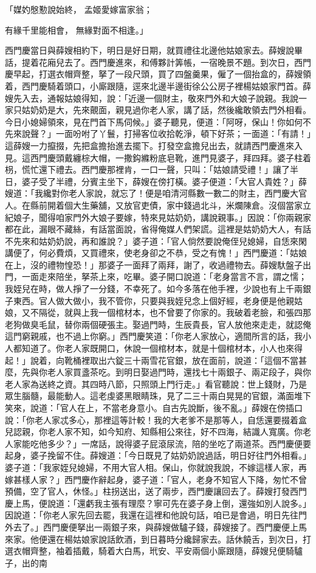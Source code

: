 「媒妁慇懃說始終，  孟姬愛嫁富家翁；

有緣千里能相會，  無緣對面不相逢。」

西門慶當日與薛嫂相約下，明日是好日期，就買禮往北邊他姑娘家去。薛嫂說畢話，提着花廂兒去了。西門慶進來，和傅夥計筭帳，一宿晚景不題。到次日，西門慶早起，打選衣帽齊整，拏了一段尺頭，買了四盤羹果，僱了一個抬盒的，薛嫂領着，西門慶騎着頭口，小廝跟隨，逕來北邊半邊街徐公公房子裡楊姑娘家門首。薛嫂先入去，通報姑娘得知，說：「近邊一個財主，敬來門外和大娘子說親。我說一家只姑奶奶是大，先來覿面，親見過你老人家，講了話，然後纔敢領去門外相看。今日小媳婦領來，見在門首下馬伺候。」婆子聽見，便道：「阿呀，保山！你如何不先來說聲？」一面吩咐了丫鬟，打掃客位收拾乾淨，頓下好茶；一面道：「有請！」這薛嫂一力攛掇，先把盒擔抬進去擺下。打發空盒擔兒出去，就請西門慶進來入見。這西門慶頭戴纏棕大帽，一撒鈎縧粉底皂靴，進門見婆子，拜四拜。婆子柱着枴，慌忙還下禮去。西門慶那裡肯，一口一聲，只叫：「姑娘請受禮！」讓了半日，婆子受了半禮，分賓主坐下，薛嫂在傍打橫。婆子便道：「大官人貴姓？」薛嫂道：「我纔對你老人家說，就忘了！便是咱清河縣數一數二的財主，西門慶大官人。在縣前開着個大生藥舖，又放官吏債，家中錢過北斗，米爛陳倉。沒個當家立紀娘子，聞得咱家門外大娘子要嫁，特來見姑奶奶，講說親事。」因說：「你兩親家都在此，漏眼不藏絲，有話當面說，省得俺媒人們架謊。這裡是姑奶奶大人，有話不先來和姑奶奶說，再和誰說？」婆子道：「官人倘然要說俺侄兒媳婦，自恁來閑講便了，何必費煩，又買禮來，使老身卻之不恭，受之有愧！」西門慶道：「姑娘在上，沒的禮物惶恐！」那婆子一面拜了兩拜，謝了，收過禮物去。薛嫂馱盤子出門，一面走來陪坐，拏茶上來，吃畢。婆子開口說道：「老身當言不言，謂之懦；我姪兒在時，做人掙了一分錢，不幸死了。如今多落在他手裡，少說也有上千兩銀子東西。官人做大做小，我不管你，只要與我姪兒念上個好經，老身便是他親姑娘，又不隔從，就與上我一個棺材本，也不曾要了你家的。我破着老臉，和張四那老狗做臭毛鼠，替你兩個硬張主。娶過門時，生辰貴長，官人放他來走走，就認俺這門窮親戚，也不過上你窮。」西門慶笑道：「你老人家放心，適間所言的話，我小人都知道了。你老人家既開口，休說一個棺材本，就是十個棺材本，小人也來得起！」說着，向靴桶裡取出六錠三十兩雪花官銀，放在面前，說道：「這個不當甚麼，先與你老人家買盞茶吃。到明日娶過門時，還找七十兩銀子、兩疋段子，與你老人家為送終之資。其四時八節，只照頭上門行走。」看官聽說：世上錢財，乃是眾生腦髓，最能動人。這老虔婆黑眼睛珠，見了二三十兩白晃晃的官銀，滿面堆下笑來，說道：「官人在上，不當老身意小。自古先說斷，後不亂。」薛嫂在傍插口說：「你老人家忒多心，那裡這等計較！我的大老爹不是那等人，自恁還要掇着盒兒認親，你老人家不知，如今知府、知縣相公來往，好不四海，結識人寬廣。你老人家能吃他多少？」一席話，說得婆子屁滾尿流，陪的坐吃了兩道茶。西門慶便要起身，婆子挽留不住。薛嫂道：「今日既見了姑奶奶說過話，明日好往門外相看。」婆子道：「我家姪兒媳婦，不用大官人相。保山，你就說我說，不嫁這樣人家，再嫁甚樣人家？」西門慶作辭起身，婆子道：「官人，老身不知官人下降，匆忙不曾預備，空了官人，休怪。」柱拐送出，送了兩步，西門慶讓回去了。薛嫂打發西門慶上馬，便說道：「還虧我主張有理麼？寧可先在婆子身上倒，還強如別人說多。」因說道：「你老人家先回去罷，我還在這裡和他說句話，咱已是會過，明日先往門外去了。」西門慶便拏出一兩銀子來，與薛嫂做驢子錢，薛嫂接了。西門慶便上馬來家。他便還在楊姑娘家說話飲酒，到日暮時分纔歸家去。話休饒舌，到次日，打選衣帽齊整，袖着插戴，騎着大白馬，玳安、平安兩個小廝跟隨，薛嫂兒便騎驢子，出的南